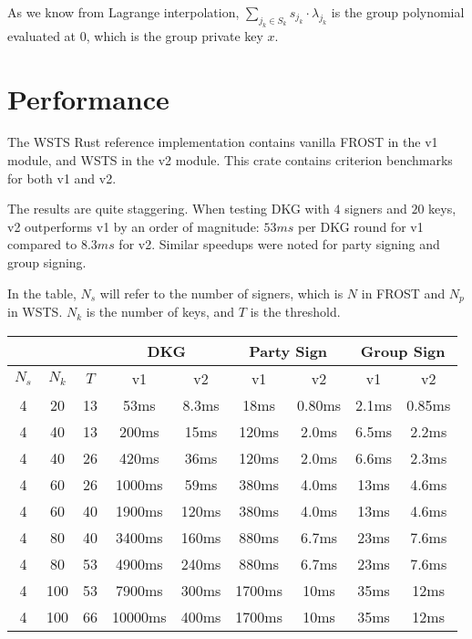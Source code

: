 \documentclass{article}
\theoremstyle{definition}
\theoremstyle{remark}
\begin{document}
As we know from Lagrange interpolation, $\sum_{j_k \in S_k}^{} s_{j_k} \cdot \lambda_{j_k}$ is the group polynomial evaluated at $0$, which is the group private key $x$.


\newpage
\onecolumn
\section{
  Performance
}

The WSTS Rust reference implementation \cite{tmfrost} contains vanilla FROST in the v1 module, and WSTS in the v2 module.  This crate contains criterion benchmarks for both v1 and v2.

The results are quite staggering.  When testing DKG with $4$ signers and $20$ keys, v2 outperforms v1 by an order of magnitude: $53 ms$ per DKG round for v1 compared to $8.3 ms$ for v2.  Similar speedups were noted for party signing and group signing.

In the table, $N_s$ will refer to the number of signers, which is $N$ in FROST and $N_p$ in WSTS.  $N_k$ is the number of keys, and $T$ is the threshold.

\begin{center}
  \begin{tabular}{ c|c|c|c|c|c|c|c|c } 
    \multicolumn{3}{c|}{} & \multicolumn{2}{|c|}{DKG}& \multicolumn{2}{|c|}{Party Sign} & \multicolumn{2}{|c}{Group Sign} \\
    \hline
    \hline
    $N_s$ & $N_k$ & $T$ & v1 & v2 & v1 & v2 & v1 & v2 \\ 
    \hline
    \hline
    4 & 20 & 13 & 53ms & 8.3ms & 18ms & 0.80ms & 2.1ms & 0.85ms \\ 
    4 & 40 & 13 & 200ms & 15ms & 120ms & 2.0ms & 6.5ms & 2.2ms \\ 
    4 & 40 & 26 & 420ms & 36ms & 120ms & 2.0ms & 6.6ms & 2.3ms \\ 
    4 & 60 & 26 & 1000ms & 59ms & 380ms & 4.0ms & 13ms & 4.6ms \\ 
    4 & 60 & 40 & 1900ms & 120ms & 380ms & 4.0ms & 13ms & 4.6ms \\ 
    4 & 80 & 40 & 3400ms & 160ms & 880ms & 6.7ms & 23ms & 7.6ms \\ 
    4 & 80 & 53 & 4900ms & 240ms & 880ms & 6.7ms & 23ms & 7.6ms \\ 
    4 & 100 & 53 & 7900ms & 300ms & 1700ms & 10ms & 35ms & 12ms \\ 
    4 & 100 & 66 & 10000ms & 400ms & 1700ms & 10ms & 35ms & 12ms \\ 
  \end{tabular}
\end{center}
\end{document}
